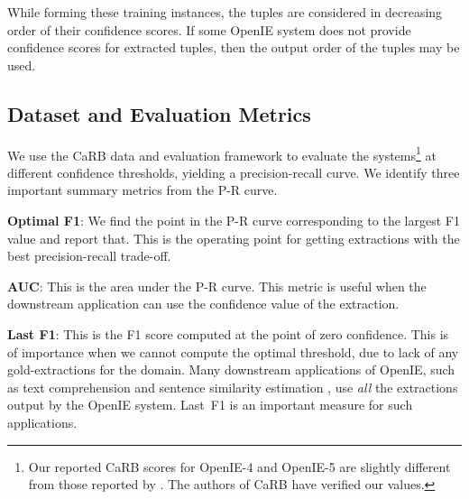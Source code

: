         While forming these training instances, the tuples are considered in decreasing order of their confidence scores.  If some OpenIE system does not provide confidence scores for extracted tuples, then the output order of the tuples may be used.  

    \subsection{Dataset and Evaluation Metrics}

        We use the CaRB data and evaluation framework \cite{bhardwaj&al19} to evaluate the systems\footnote{Our reported CaRB scores for OpenIE-4 and OpenIE-5 are slightly different from those reported by \citet{bhardwaj&al19}. The authors of CaRB have verified our values.} at different confidence thresholds, yielding a precision-recall curve. We identify three important summary metrics from the P-R curve. 


        \noindent \textbf{Optimal F1}: We find the point in the P-R curve corresponding to the largest F1 value and report that.  This is the operating point for getting extractions with the best precision-recall trade-off.

        \noindent \textbf{AUC}: This is the area under the P-R curve. This metric is useful when the downstream application can use the confidence value of the extraction.

        \noindent \textbf{Last F1}: This is the F1 score computed at the point of zero confidence. This is of importance when we cannot compute the optimal threshold, due to lack of any gold-extractions for the domain. Many downstream applications of OpenIE, such as text comprehension \citep{stanovsky&al15} and sentence similarity estimation \citep{janara&al14}, use \emph{all} the extractions output by the OpenIE system. Last~F1 is an important measure for such applications.

